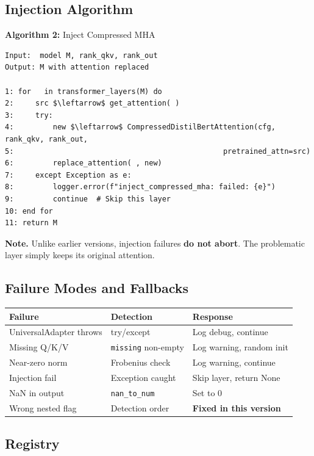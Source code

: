\subsection{Injection Algorithm}

\textbf{Algorithm 2:} Inject Compressed MHA
\begin{lstlisting}
Input:  model M, rank_qkv, rank_out
Output: M with attention replaced

1: for   in transformer_layers(M) do
2:     src $\leftarrow$ get_attention( )
3:     try:
4:         new $\leftarrow$ CompressedDistilBertAttention(cfg, rank_qkv, rank_out, 
5:                                                pretrained_attn=src)
6:         replace_attention( , new)
7:     except Exception as e:
8:         logger.error(f"inject_compressed_mha: failed: {e}")
9:         continue  # Skip this layer
10: end for
11: return M
\end{lstlisting}

\textbf{Note.} Unlike earlier versions, injection failures \textbf{do not abort}. 
The problematic layer simply keeps its original attention.

\subsection{Failure Modes and Fallbacks}

\begin{table}[H]
\centering
\small
\begin{tabular}{lll}
\toprule
\textbf{Failure} & \textbf{Detection} & \textbf{Response} \\
\midrule
UniversalAdapter throws & try/except & Log debug, continue \\
Missing Q/K/V & \texttt{missing} non-empty & Log warning, random init \\
Near-zero norm & Frobenius check & Log warning, continue \\
Injection fail & Exception caught & Skip layer, return None \\
NaN in output & \texttt{nan\_to\_num} & Set to 0 \\
Wrong nested flag & Detection order & \textbf{Fixed in this version} \\
\bottomrule
\end{tabular}
\end{table}

\subsection{Registry}

